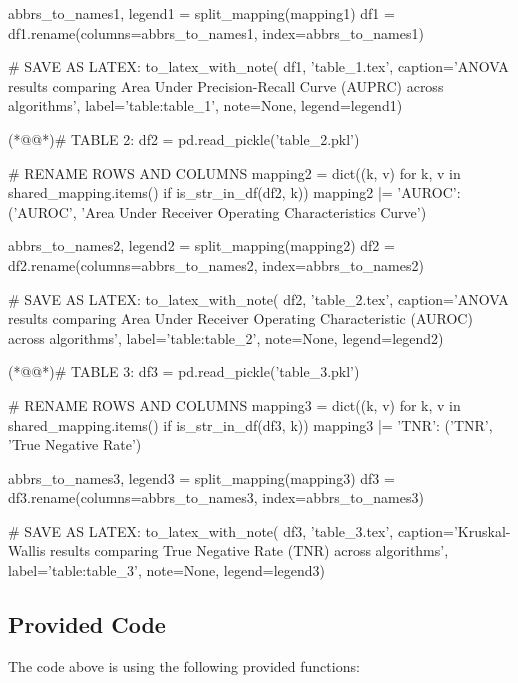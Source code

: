 \documentclass[11pt]{article}
\begin{document}
\begin{python}
abbrs_to_names1, legend1 = split_mapping(mapping1)
df1 = df1.rename(columns=abbrs_to_names1, index=abbrs_to_names1)

# SAVE AS LATEX:
to_latex_with_note(
    df1, 'table_1.tex',
    caption='ANOVA results comparing Area Under Precision-Recall Curve (AUPRC) across algorithms', 
    label='table:table_1',
    note=None,
    legend=legend1)

(*@@*)# TABLE 2:
df2 = pd.read_pickle('table_2.pkl')

# RENAME ROWS AND COLUMNS
mapping2 = dict((k, v) for k, v in shared_mapping.items() if is_str_in_df(df2, k)) 
mapping2 |= {'AUROC': ('AUROC', 'Area Under Receiver Operating Characteristics Curve')}

abbrs_to_names2, legend2 = split_mapping(mapping2)
df2 = df2.rename(columns=abbrs_to_names2, index=abbrs_to_names2)

# SAVE AS LATEX:
to_latex_with_note(
    df2, 'table_2.tex',
    caption='ANOVA results comparing Area Under Receiver Operating Characteristic (AUROC) across algorithms', 
    label='table:table_2',
    note=None,
    legend=legend2)

(*@@*)# TABLE 3:
df3 = pd.read_pickle('table_3.pkl')

# RENAME ROWS AND COLUMNS
mapping3 = dict((k, v) for k, v in shared_mapping.items() if is_str_in_df(df3, k)) 
mapping3 |= {'TNR': ('TNR', 'True Negative Rate')}

abbrs_to_names3, legend3 = split_mapping(mapping3)
df3 = df3.rename(columns=abbrs_to_names3, index=abbrs_to_names3)

# SAVE AS LATEX:
to_latex_with_note(
    df3, 'table_3.tex',
    caption='Kruskal-Wallis results comparing True Negative Rate (TNR) across algorithms', 
    label='table:table_3',
    note=None,
    legend=legend3)

\end{python}

\subsection{Provided Code}
The code above is using the following provided functions:
\end{document}
